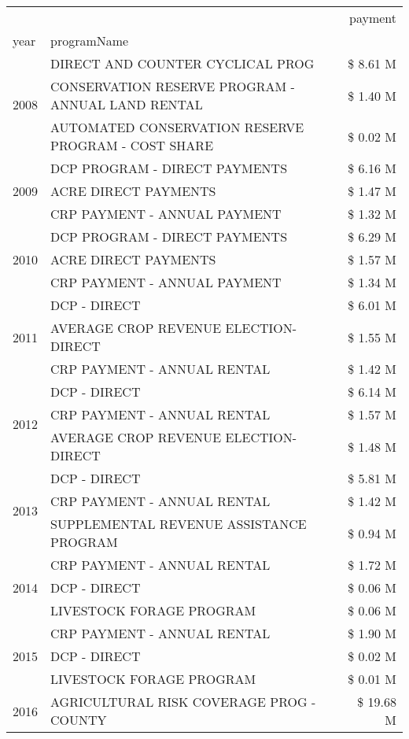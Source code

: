 \begin{tabular}{llr}
\toprule
 &  & payment \\
year & programName &  \\
\midrule
\multirow[t]{3}{*}{2008} & DIRECT AND COUNTER CYCLICAL PROG & \$ 8.61 M \\
 & CONSERVATION RESERVE PROGRAM - ANNUAL LAND RENTAL & \$ 1.40 M \\
 & AUTOMATED CONSERVATION RESERVE PROGRAM - COST SHARE & \$ 0.02 M \\
\cline{1-3}
\multirow[t]{3}{*}{2009} & DCP PROGRAM - DIRECT PAYMENTS & \$ 6.16 M \\
 & ACRE DIRECT PAYMENTS & \$ 1.47 M \\
 & CRP PAYMENT - ANNUAL PAYMENT & \$ 1.32 M \\
\cline{1-3}
\multirow[t]{3}{*}{2010} & DCP PROGRAM - DIRECT PAYMENTS & \$ 6.29 M \\
 & ACRE DIRECT PAYMENTS & \$ 1.57 M \\
 & CRP PAYMENT - ANNUAL PAYMENT & \$ 1.34 M \\
\cline{1-3}
\multirow[t]{3}{*}{2011} & DCP - DIRECT & \$ 6.01 M \\
 & AVERAGE CROP REVENUE ELECTION-DIRECT & \$ 1.55 M \\
 & CRP PAYMENT - ANNUAL RENTAL & \$ 1.42 M \\
\cline{1-3}
\multirow[t]{3}{*}{2012} & DCP - DIRECT & \$ 6.14 M \\
 & CRP PAYMENT - ANNUAL RENTAL & \$ 1.57 M \\
 & AVERAGE CROP REVENUE ELECTION-DIRECT & \$ 1.48 M \\
\cline{1-3}
\multirow[t]{3}{*}{2013} & DCP - DIRECT & \$ 5.81 M \\
 & CRP PAYMENT - ANNUAL RENTAL & \$ 1.42 M \\
 & SUPPLEMENTAL REVENUE ASSISTANCE PROGRAM & \$ 0.94 M \\
\cline{1-3}
\multirow[t]{3}{*}{2014} & CRP PAYMENT - ANNUAL RENTAL & \$ 1.72 M \\
 & DCP - DIRECT & \$ 0.06 M \\
 & LIVESTOCK FORAGE PROGRAM & \$ 0.06 M \\
\cline{1-3}
\multirow[t]{3}{*}{2015} & CRP PAYMENT - ANNUAL RENTAL & \$ 1.90 M \\
 & DCP - DIRECT & \$ 0.02 M \\
 & LIVESTOCK FORAGE PROGRAM & \$ 0.01 M \\
\cline{1-3}
\multirow[t]{3}{*}{2016} & AGRICULTURAL RISK COVERAGE PROG - COUNTY      & \$ 19.68 M \\

\end{tabular}
